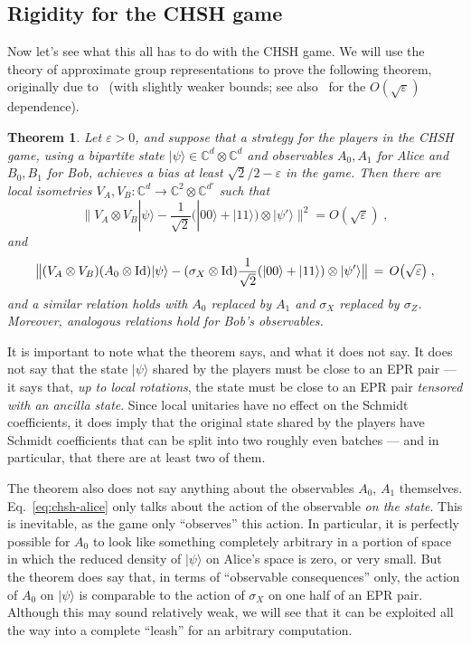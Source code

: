 \documentclass{report}
\theoremstyle{plain}
\newtheorem{theorem}[subsection]{Theorem}
\theoremstyle{definition}
\theoremstyle{remark}
\newcommand{\ket}[1]{|#1\rangle}
\newcommand{\Id}{\ensuremath{\mathop{\rm Id}\nolimits}}
\newcommand{\C}{\ensuremath{\mathbb{C}}}
\newcommand{\eps}{\varepsilon}
\numberwithin{equation}{subsection}
\begin{document}
\subsection{Rigidity for the CHSH game}
\label{section:chsh}

Now let's see what this all has to do with the CHSH game. We will use the theory of approximate group representations to prove the following theorem, originally due to~\cite{summers1988maximal} (with slightly weaker bounds; see also~\cite{mckague2012robust} for the $O(\sqrt{\eps})$ dependence).

\begin{theorem}\label{thm:rigid-chsh}
Let $\eps>0$, and suppose that a strategy for the players  in the CHSH game, using  a bipartite state $\ket{\psi}\in\C^d\otimes \C^d$ and observables $A_0,A_1$ for Alice and $B_0,B_1$ for Bob, achieves a bias at least $\sqrt{2}/2-\eps$ in the game. Then there are local isometries $V_A,V_B:\C^d \to \C^2 \otimes \C^{d'}$ such that 
\begin{equation}\label{eq:chsh-state}
\big\| V_A \otimes V_B \ket{\psi} - \frac{1}{\sqrt{2}}\big(\ket{00}+\ket{11}\big) \otimes \ket{\psi'} \big\|^2 = O(\sqrt{\eps}) \;,
\end{equation}
and 
\begin{equation}\label{eq:chsh-alice}
\big\|( V_A \otimes V_B)( A_0 \otimes \Id )\ket{\psi} - (\sigma_X \otimes \Id)\frac{1}{\sqrt{2}}(\ket{00}+\ket{11}) \otimes \ket{\psi'} \big\| \,=\, O\big(\sqrt{\eps}\big)\;,
\end{equation}
and a similar relation holds with $A_0$ replaced by $A_1$ and $\sigma_X$ replaced by $\sigma_Z$. Moreover, analogous relations hold for Bob's observables. 
\end{theorem}

It is important to note what the theorem says, and what it does not say. It does not say that the state $\ket{\psi}$ shared by the players must be close to an EPR pair --- it says that, \emph{up to local rotations}, the state must be close to an EPR pair \emph{tensored with an ancilla state}. Since local unitaries have no effect on the Schmidt coefficients, it does imply that the original state shared by the players have Schmidt coefficients that can be split into two roughly even batches --- and in particular, that there are at least two of them. 

 The theorem also does not say anything about the observables $A_0$, $A_1$ themselves. Eq.~\eqref{eq:chsh-alice} only talks about the action of the observable \emph{on the state}. This is inevitable, as the game only ``observes'' this action. In particular, it is perfectly possible for $A_0$ to look like something completely arbitrary in a portion of space in which the reduced density of $\ket{\psi}$ on Alice's space is zero, or very small. But the theorem does say that, in terms of ``observable consequences'' only, the action of $A_0$ on $\ket{\psi}$ is comparable to the action of $\sigma_X$ on one half of an EPR pair. Although this may sound relatively weak, we will see that it can be exploited all the way into a complete ``leash'' for an arbitrary computation. 
\end{document}
